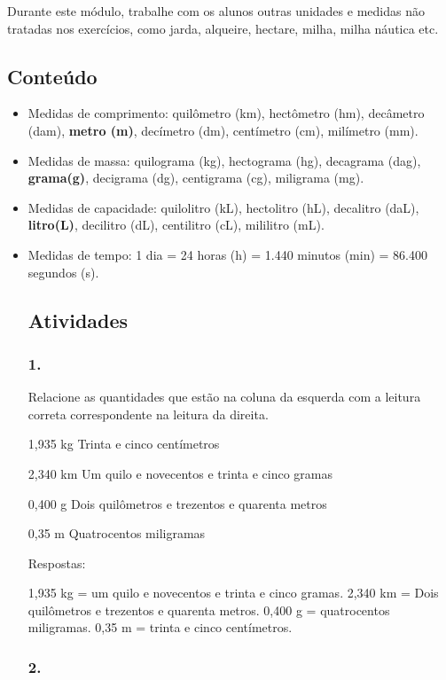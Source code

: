 \begin{enumerate}
\begin{escolha}
\begin{enumerate}
\begin{itemize}
Durante este módulo, trabalhe com os alunos outras
unidades e medidas não tratadas nos exercícios, como
jarda, alqueire, hectare, milha, milha náutica etc.

\subsection{Conteúdo}\label{conteuxfado-3}

\begin{itemize}
  \item Medidas de comprimento:
  quilômetro (km), hectômetro (hm), decâmetro (dam), \textbf{metro (m)}, decímetro (dm), centímetro (cm), milímetro (mm).
  \item Medidas de massa:
  quilograma (kg), hectograma (hg), decagrama (dag), \textbf{grama(g)}, decigrama (dg), centigrama (cg), miligrama (mg).
  \item Medidas de capacidade:
  quilolitro (kL), hectolitro (hL), decalitro (daL), \textbf{litro(L)}, decilitro (dL), centilitro (cL), mililitro (mL).
  \item Medidas de tempo:
  1 dia = 24 horas (h) = 1.440 minutos (min) = 86.400 segundos (s).

\subsection{Atividades}\label{atividades-3}

\subsubsection{1.}\label{section-39}

Relacione as quantidades que estão na coluna da esquerda com a leitura correta
correspondente na leitura da direita.

1,935 kg Trinta e cinco centímetros

2,340 km Um quilo e novecentos e trinta e cinco gramas

0,400 g Dois quilômetros e trezentos e quarenta metros

0,35 m Quatrocentos miligramas

Respostas:

1,935 kg = um quilo e novecentos e trinta e cinco gramas.
2,340 km = Dois quilômetros e trezentos e quarenta metros.
0,400 g = quatrocentos miligramas.
0,35 m = trinta e cinco centímetros.

\subsubsection{2.}\label{section-40}


\end{itemize}
\end{itemize}
\end{enumerate}
\end{escolha}
\end{enumerate}
